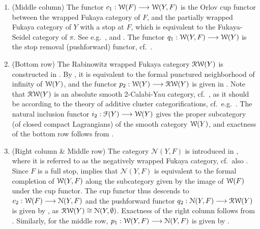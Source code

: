 \begin{enumerate}
    \item (Middle column) The functor $c_1:\mathcal{W}(F)\longrightarrow\mathcal{W}(Y,F)$ is the Orlov cup functor between the wrapped Fukaya category of $F$, and the partially wrapped Fukaya category of $Y$ with a stop at $F$, which is equivalent to the Fukaya-Seidel category of $\pi$. See e.g.~\cite[Section 2.4]{Syl19}, \cite[Section 3.5]{GPSCV} and \cite[Example 1.23]{GPS18}. The functor $q_1:\mathcal{W}(Y,F)\longrightarrow\mathcal{W}(Y)$ is the stop removal (pushforward) functor, cf.~\cite[Theorem 1.20]{GPS18}.\\

    \item (Bottom row) The Rabinowitz wrapped Fukaya category $\mathcal{R}\mathcal{W}(Y)$ is constructed in \cite[Section 4]{ganatra2022rabinowitzfukayacategoriescategorical}. By \cite[Theorem 1.1]{ganatra2022rabinowitzfukayacategoriescategorical}, it is equivalent to the formal punctured neighborhood of infinity of $\mathcal{W}(Y)$, and the functor $p_2:\mathcal{W}(Y)\longrightarrow \mathcal{R}\mathcal{W}(Y)$ is given in \cite[Lemma 4.11]{ganatra2022rabinowitzfukayacategoriescategorical}. Note that $\mathcal{R}\mathcal{W}(Y)$ is an absolute smooth 2-Calabi-Yau category, cf.~\cite[Theorem 1.2.(1)]{bae2024calabiyaustructuresrabinowitzfukaya}, as it should be according to the theory of additive cluster categorifications, cf.~e.g.~\cite[Sections 2\&3]{amiot2011generalizedclustercategories}. The natural inclusion functor $i_2:\mathcal{F}(Y)\longrightarrow\mathcal{W}(Y)$ gives the proper subcategory (of closed compact Lagrangians) of the smooth category $\mathcal{W}(Y)$, and exactness of the bottom row follows from \cite[Corollary 1.4]{ganatra2022rabinowitzfukayacategoriescategorical}.\\
    
    \item (Right column \& Middle row) The category $\mathcal{N}(Y,F)$ is introduced in \cite[Section 3.5]{gao2024fukayaainfinitystructurenear}, where it is referred to as the negatively wrapped Fukaya category, cf.~also \cite[Section 5]{seidel2025fukayaainftystructuresassociatedlefschetz}. Since $F$ is a full stop, \cite[Theorem 1.1.(ii)]{gao2024fukayaainfinitystructurenear} implies that $\mathcal{N}(Y,F)$ is equivalent to the formal completion of $\mathcal{W}(Y,F)$ along the subcategory given by the image of $\mathcal{W}(F)$ under the cup functor. The cup functor thus descends to $c_2:\mathcal{W}(F)\longrightarrow\mathcal{N}(Y,F)$ and the pushforward functor $q_2:\mathcal{N}(Y,F)\longrightarrow\mathcal{R}\mathcal{W}(Y)$ is given by \cite[Theorem 1.5]{gao2024fukayaainfinitystructurenear}, as $\mathcal{R}\mathcal{W}(Y)\cong \mathcal{N}(Y,\emptyset)$. Exactness of the right column follows from \cite[Corollary 1.2]{gao2024fukayaainfinitystructurenear}. Similarly, for the middle row, $p_1:\mathcal{W}(Y,F)\longrightarrow\mathcal{N}(Y,F)$ is given by \cite[(1.12)]{gao2024fukayaainfinitystructurenear}.
\end{enumerate}
